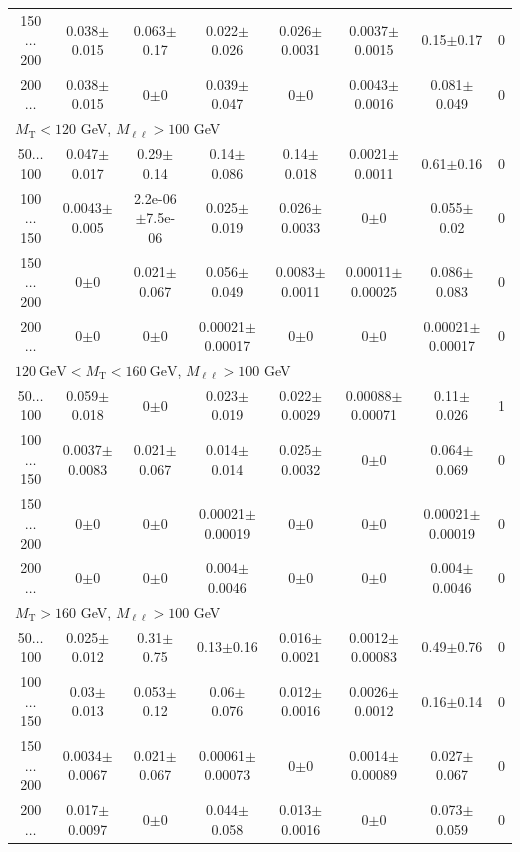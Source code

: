\begin{landscape}
\begin{table}
\begin{center}
\begin{tabular}{| c | c c c c c c c | }
150$\dots$200&0.038$\pm$0.015&0.063$\pm$0.17&0.022$\pm$0.026&0.026$\pm$0.0031&0.0037$\pm$0.0015&0.15$\pm$0.17&0\\
200$\dots$&0.038$\pm$0.015&0$\pm$0&0.039$\pm$0.047&0$\pm$0&0.0043$\pm$0.0016&0.081$\pm$0.049&0\\
\hline\hline
\multicolumn{8}{l}{$M_{\text{T}} < 120$ GeV, $M_{\ell\ell} > 100$ GeV}\\\hline\hline
50$\dots$100&0.047$\pm$0.017&0.29$\pm$0.14&0.14$\pm$0.086&0.14$\pm$0.018&0.0021$\pm$0.0011&0.61$\pm$0.16&0\\
100$\dots$150&0.0043$\pm$0.005&2.2e-06$\pm$7.5e-06&0.025$\pm$0.019&0.026$\pm$0.0033&0$\pm$0&0.055$\pm$0.02&0\\
150$\dots$200&0$\pm$0&0.021$\pm$0.067&0.056$\pm$0.049&0.0083$\pm$0.0011&0.00011$\pm$0.00025&0.086$\pm$0.083&0\\
200$\dots$&0$\pm$0&0$\pm$0&0.00021$\pm$0.00017&0$\pm$0&0$\pm$0&0.00021$\pm$0.00017&0\\
\hline\hline
\multicolumn{8}{l}{$120~\mathrm{GeV} < M_{\text{T}} < 160~\mathrm{GeV}$, $M_{\ell\ell} > 100$ GeV}\\\hline\hline
50$\dots$100&0.059$\pm$0.018&0$\pm$0&0.023$\pm$0.019&0.022$\pm$0.0029&0.00088$\pm$0.00071&0.11$\pm$0.026&1\\
100$\dots$150&0.0037$\pm$0.0083&0.021$\pm$0.067&0.014$\pm$0.014&0.025$\pm$0.0032&0$\pm$0&0.064$\pm$0.069&0\\
150$\dots$200&0$\pm$0&0$\pm$0&0.00021$\pm$0.00019&0$\pm$0&0$\pm$0&0.00021$\pm$0.00019&0\\
200$\dots$&0$\pm$0&0$\pm$0&0.004$\pm$0.0046&0$\pm$0&0$\pm$0&0.004$\pm$0.0046&0\\
\hline\hline
\multicolumn{8}{l}{$M_{\text{T}} > 160$ GeV, $M_{\ell\ell} > 100$ GeV}\\\hline\hline
50$\dots$100&0.025$\pm$0.012&0.31$\pm$0.75&0.13$\pm$0.16&0.016$\pm$0.0021&0.0012$\pm$0.00083&0.49$\pm$0.76&0\\
100$\dots$150&0.03$\pm$0.013&0.053$\pm$0.12&0.06$\pm$0.076&0.012$\pm$0.0016&0.0026$\pm$0.0012&0.16$\pm$0.14&0\\
150$\dots$200&0.0034$\pm$0.0067&0.021$\pm$0.067&0.00061$\pm$0.00073&0$\pm$0&0.0014$\pm$0.00089&0.027$\pm$0.067&0\\
200$\dots$&0.017$\pm$0.0097&0$\pm$0&0.044$\pm$0.058&0.013$\pm$0.0016&0$\pm$0&0.073$\pm$0.059&0\\
\hline\hline
\end{tabular}
\end{center}
\end{table}

\end{landscape}
